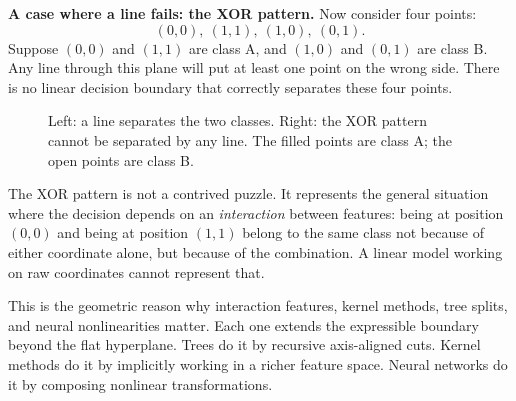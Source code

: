 \textbf{A case where a line fails: the XOR pattern.} Now consider four points:
\[
(0,0),\ (1,1),\ (1,0),\ (0,1).
\]
Suppose $(0,0)$ and $(1,1)$ are class A, and $(1,0)$ and $(0,1)$ are class B. Any line through this plane will put at least one point on the wrong side. There is no linear decision boundary that correctly separates these four points.

\begin{figure}[t]
\centering
{}
\caption{Left: a line separates the two classes. Right: the XOR pattern cannot be separated by any line. The filled points are class A; the open points are class B.}
\label{fig:linear-separability}
\end{figure}

The XOR pattern is not a contrived puzzle. It represents the general situation where the decision depends on an \emph{interaction} between features: being at position $(0,0)$ and being at position $(1,1)$ belong to the same class not because of either coordinate alone, but because of the combination. A linear model working on raw coordinates cannot represent that.

This is the geometric reason why interaction features, kernel methods, tree splits, and neural nonlinearities matter. Each one extends the expressible boundary beyond the flat hyperplane. Trees do it by recursive axis-aligned cuts. Kernel methods do it by implicitly working in a richer feature space. Neural networks do it by composing nonlinear transformations.

